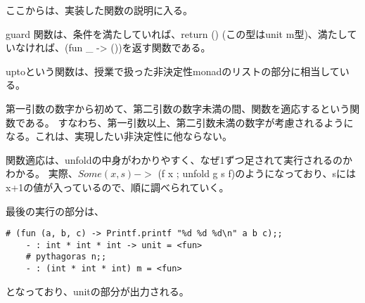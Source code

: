 \documentclass[uplatex,12pt]{jsarticle}
\begin{document}
ここからは、実装した関数の説明に入る。

guard 関数は、条件を満たしていれば、return () (この型はunit m型)、満たしていなければ、(fun _ -> ())を返す関数である。


uptoという関数は、授業で扱った非決定性monadのリストの部分に相当している。

第一引数の数字から初めて、第二引数の数字未満の間、関数を適応するという関数である。
すなわち、第一引数以上、第二引数未満の数字が考慮されるようになる。これは、実現したい非決定性に他ならない。

関数適応は、unfoldの中身がわかりやすく、なぜ1ずつ足されて実行されるのかわかる。
実際、$ Some (x, s) ->$ (f x ; unfold g s f)のようになっており、sにはx+1の値が入っているので、順に調べられていく。


最後の実行の部分は、
  \begin{lstlisting}[caption=実行部分の型]
    # (fun (a, b, c) -> Printf.printf "%d %d %d\n" a b c);;
    - : int * int * int -> unit = <fun>
    # pythagoras n;;
    - : (int * int * int) m = <fun>
  \end{lstlisting}
となっており、unitの部分が出力される。
\end{document}
